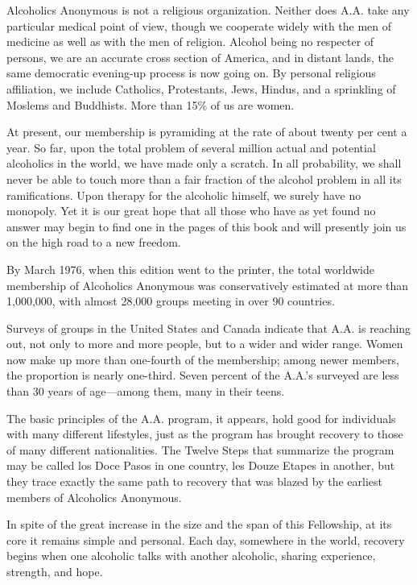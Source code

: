 \begin{biblechapter}
\verse Alcoholics Anonymous is not a religious organization.
\verse Neither does A.A. take any particular medical point of view, 
    though we cooperate widely with the men of medicine as well as with the men of religion.
\verse Alcohol being no respecter of persons, 
    we are an accurate cross section of America, 
    and in distant lands, the same democratic evening-up process is now going on. 
\verse By personal religious affiliation, we include Catholics, Protestants, Jews, Hindus, 
    and a sprinkling of Moslems and Buddhists. 
\verse More than 15\% of us are women.

\verse At present, our membership is pyramiding at the rate of about twenty per cent a year.
\verse So far, upon the total problem of several million actual and potential alcoholics in the world, 
    we have made only a scratch.
\verse In all probability, we shall never be able to touch more than a fair fraction of the alcohol problem in all its ramifications.
\verse Upon therapy for the alcoholic himself, we surely have no monopoly. 
\verse Yet it is our great hope that all those who have as yet found no answer 
    may begin to find one in the pages of this book 
    and will presently join us on the high road to a new freedom.
\end{biblechapter}



\begin{biblechapter}
    By March 1976, when this edition went to the printer, 
    the total worldwide membership of Alcoholics Anonymous was conservatively estimated at more than 1,000,000, 
    with almost 28,000 groups meeting in over 90 countries.

\verse Surveys of groups in the United States and Canada indicate that A.A. is reaching out, 
    not only to more and more people, but to a wider and wider range.
\verse Women now make up more than one-fourth of the membership; 
    among newer members, the proportion is nearly one-third. 
\verse Seven percent of the A.A.’s surveyed are less than 30 years of age—among them, many in their teens.

\verse The basic principles of the A.A. program, it appears, hold  good  for  individuals  with  many  different lifestyles, 
    just as the program has brought recovery to those of many different nationalities. 
\verse The Twelve Steps that summarize the program may be called los Doce Pasos in one country, 
    les Douze Etapes in another, 
    but they trace exactly the same path to recovery that was blazed by the earliest members of Alcoholics Anonymous.

\verse In spite of the great increase in the size and the span of this Fellowship, 
    at its core it remains simple and personal. 
\verse Each day, somewhere in the world, recovery begins when one alcoholic talks with another alcoholic, 
    sharing experience, strength, and hope.
\end{biblechapter}

